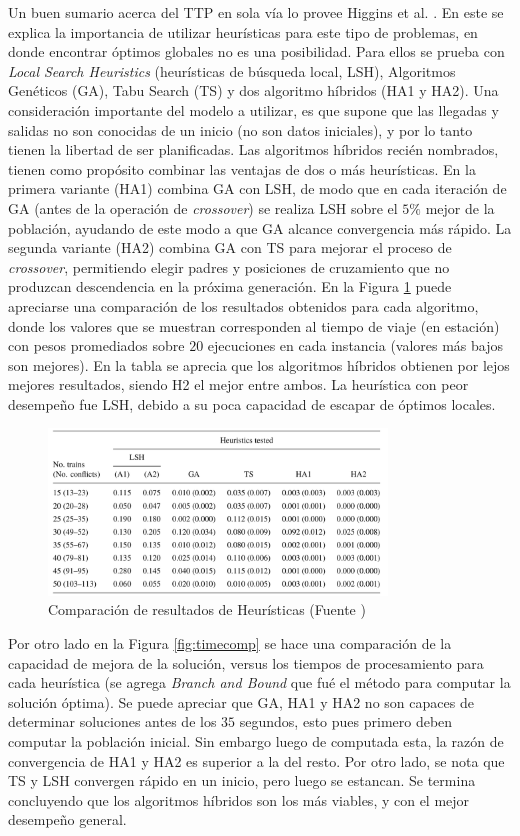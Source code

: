 \documentclass[letter, 10pt]{article}
\begin{document}
\begin{description}
    Un buen sumario acerca del TTP en sola vía lo provee Higgins et al. \cite{Higgins}. En este se explica la importancia de utilizar heurísticas para este tipo de problemas, en donde encontrar óptimos globales no es una posibilidad. Para ellos se prueba con \textit{Local Search Heuristics} (heurísticas de búsqueda local, LSH), Algoritmos Genéticos (GA), Tabu Search (TS) y dos algoritmo híbridos (HA1 y HA2). Una consideración importante del modelo a utilizar, es que supone que las llegadas y salidas no son conocidas de un inicio (no son datos iniciales), y por lo tanto tienen la libertad de ser planificadas. Las algoritmos híbridos recién nombrados, tienen como propósito combinar las ventajas de dos o más heurísticas. En la primera variante (HA1) combina GA con LSH, de modo que en cada iteración de GA (antes de la operación de \textit{crossover}) se realiza LSH sobre el $5\%$ mejor de la población, ayudando de este modo a que GA alcance convergencia más rápido. La segunda variante (HA2) combina GA con TS para mejorar el proceso de \textit{crossover}, permitiendo elegir padres y posiciones de cruzamiento que no produzcan descendencia en la próxima generación. En la Figura \ref{fig:rescomp} puede apreciarse una comparación de los resultados obtenidos para cada algoritmo, donde los valores que se muestran corresponden al tiempo de viaje (en estación) con pesos    promediados sobre $20$ ejecuciones en cada instancia (valores más bajos son mejores). En la tabla se aprecia que los algoritmos híbridos obtienen por lejos mejores resultados, siendo H2 el mejor entre ambos. La heurística con peor desempeño fue LSH, debido a su poca capacidad de escapar de óptimos locales.
     \begin{figure}[htpb!]
    \centering
    \includegraphics[width=9cm]{rescomp}
    \caption{Comparación de resultados de Heurísticas (Fuente \cite{Higgins})}
    \label{fig:rescomp}
    \end{figure}
    Por otro lado en la Figura \ref{fig:timecomp} se hace una comparación de la capacidad de mejora de la solución, versus los tiempos de procesamiento para cada heurística (se agrega \textit{Branch and Bound} que fué el método para computar la solución óptima). Se puede apreciar que GA, HA1 y HA2 no son capaces de determinar soluciones antes de los $35$ segundos, esto pues primero deben computar la población inicial. Sin embargo luego de computada esta, la razón de convergencia de HA1 y HA2 es superior a la del resto. Por otro lado, se nota que TS y LSH convergen rápido en un inicio, pero luego se estancan. Se termina concluyendo que los algoritmos híbridos son los más viables, y con el mejor desempeño general.


\end{description}
\end{document}
